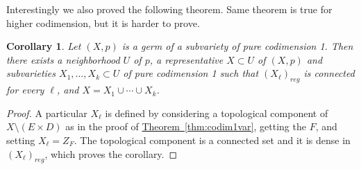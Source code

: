 \documentclass[12pt,openany]{book}
\theoremstyle{plain}
\newtheorem{cor}[thm]{Corollary}
\theoremstyle{remark}
\theoremstyle{definition}
\theoremstyle{exercise}
\theoremstyle{example}
\newcommand{\thmref}[1]{\hyperref[#1]{Theorem~\ref*{#1}}}
\begin{document}
Interestingly we also proved the following theorem.  Same theorem is true
for higher codimension, but it is harder to prove.

\begin{cor}
Let $(X,p)$ is a germ of a subvariety of pure codimension 1.  Then there exists
a neighborhood $U$ of $p$, a representative $X \subset U$ of $(X,p)$
and subvarieties $X_1,\ldots,X_k \subset U$
of pure codimension 1 such that $(X_\ell)_{\mathit{reg}}$ is connected for
every $\ell$, and
$X = X_1 \cup \cdots \cup X_k$.
\end{cor}

\begin{proof}
A particular $X_\ell$ is defined by considering a topological component of $X \setminus
(E \times D)$ as in the proof of \thmref{thm:codim1var}, getting the $F$,
and setting $X_\ell = Z_F$.
The topological component is a connected set and it is dense in
$(X_\ell)_{\mathit{reg}}$, which proves the corollary.
\end{proof}
\end{document}
